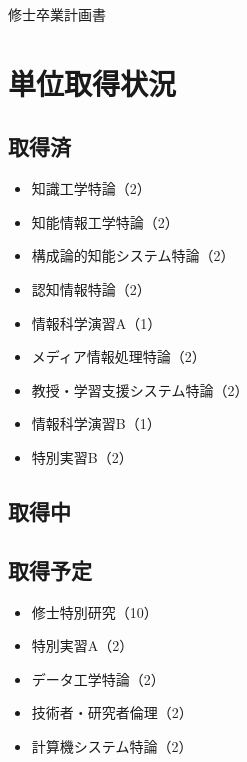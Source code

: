 \documentclass[a4paper,12pt]{ltjsarticle}
\begin{document}
\centerline{\huge 修士卒業計画書}


\section*{単位取得状況}
    \subsection*{取得済}
    \begin{itemize}
        \item 知識工学特論（2）
        \item 知能情報工学特論（2）
        \item 構成論的知能システム特論（2）
        \item 認知情報特論（2）
        \item 情報科学演習A（1）
        \item メディア情報処理特論（2）
        \item 教授・学習支援システム特論（2）
        \item 情報科学演習B（1）
        \item 特別実習B（2）
    \end{itemize}
    \subsection*{取得中}
    \begin{itemize}
    \end{itemize}
    \subsection*{取得予定}
    \begin{itemize}
        \item 修士特別研究（10）
        \item 特別実習A（2）
        \item データ工学特論（2）
        \item 技術者・研究者倫理（2）
        \item 計算機システム特論（2）
    \end{itemize}
\end{document}
